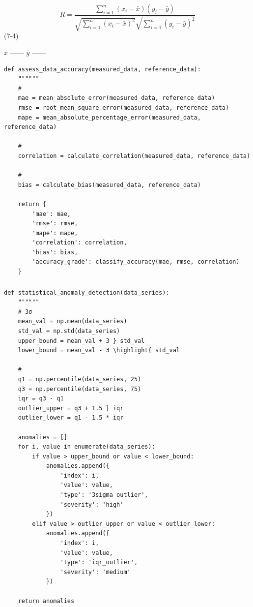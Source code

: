 
\[R = \frac{\sum_{i=1}^{n}(x_i - \bar{x})(y_i - \bar{y})}{\sqrt{\sum_{i=1}^{n}(x_i - \bar{x})^2}\sqrt{\sum_{i=1}^{n}(y_i - \bar{y})^2}}\]
(7-4)

\(\bar{x}\) ------ \(\bar{y}\) ------

\begin{lstlisting}[style=python]
def assess_data_accuracy(measured_data, reference_data):
    """"""
    # 
    mae = mean_absolute_error(measured_data, reference_data)
    rmse = root_mean_square_error(measured_data, reference_data)
    mape = mean_absolute_percentage_error(measured_data, reference_data)
    
    # 
    correlation = calculate_correlation(measured_data, reference_data)
    
    # 
    bias = calculate_bias(measured_data, reference_data)
    
    return {
        'mae': mae,
        'rmse': rmse,
        'mape': mape,
        'correlation': correlation,
        'bias': bias,
        'accuracy_grade': classify_accuracy(mae, rmse, correlation)
    }
\end{lstlisting}

\hypertarget{section-79}{%
\subsubsection{}\label{section-79}}

\hypertarget{section-80}{%
\paragraph{}\label{section-80}}

\begin{lstlisting}[style=python]
def statistical_anomaly_detection(data_series):
    """"""
    # 3σ
    mean_val = np.mean(data_series)
    std_val = np.std(data_series)
    upper_bound = mean_val + 3 } std_val
    lower_bound = mean_val - 3 \highlight{ std_val
    
    # 
    q1 = np.percentile(data_series, 25)
    q3 = np.percentile(data_series, 75)
    iqr = q3 - q1
    outlier_upper = q3 + 1.5 } iqr
    outlier_lower = q1 - 1.5 * iqr
    
    anomalies = []
    for i, value in enumerate(data_series):
        if value > upper_bound or value < lower_bound:
            anomalies.append({
                'index': i,
                'value': value,
                'type': '3sigma_outlier',
                'severity': 'high'
            })
        elif value > outlier_upper or value < outlier_lower:
            anomalies.append({
                'index': i,
                'value': value,
                'type': 'iqr_outlier',
                'severity': 'medium'
            })
    
    return anomalies
\end{lstlisting}

